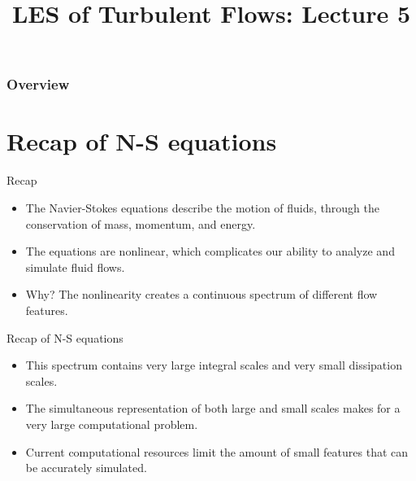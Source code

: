 
\title{LES of Turbulent Flows: Lecture 5}




\begin{frame} 
  \titlepage
\end{frame}


\begin{frame}
\frametitle{Overview}
\tableofcontents
\end{frame}

\section{Recap of N-S equations} %
\begin{frame}{Recap}

\begin{itemize}
	\item The Navier-Stokes equations describe the motion of fluids, through the conservation of mass, momentum, and energy.
	\item The equations are nonlinear, which complicates our ability to analyze and simulate fluid flows.
	\item Why? The nonlinearity creates a continuous spectrum of different flow features.
\end{itemize}

\end{frame}



\begin{frame}{Recap of N-S equations}

\begin{itemize}
	\item This spectrum contains very large integral scales and very small dissipation scales.
	\item The simultaneous representation of both large and small scales makes for a very large computational problem.
	\item Current computational resources limit the amount of small features that can be accurately simulated.
\end{itemize}
\end{frame}

